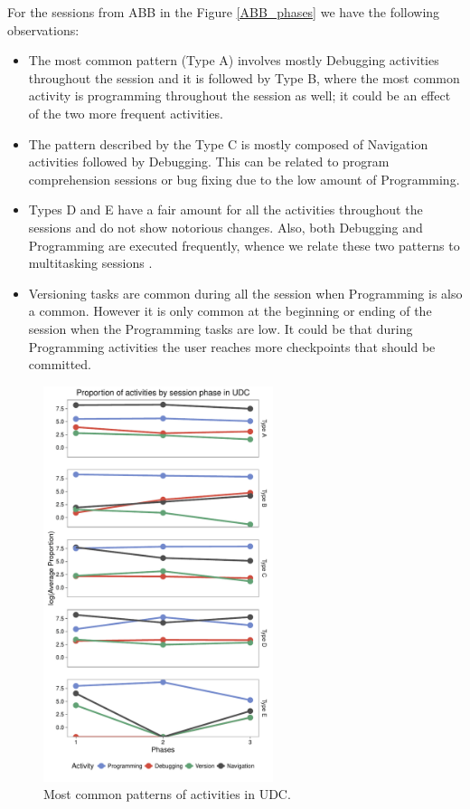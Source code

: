 For the sessions from ABB in the Figure \ref{ABB_phases} we have the following observations:
\begin{itemize}
	\item The most common pattern (Type A) involves mostly Debugging activities throughout the session and it is followed by Type B, where the most common activity is programming throughout the session as well; it could be an effect of the two more frequent activities.
	
	\item The pattern described by the Type C is mostly composed of Navigation activities followed by Debugging. This can be related to program comprehension sessions \cite{MMLK14} or bug fixing due to the low amount of Programming.
	
	\item Types D and E have a fair amount for all the activities throughout the sessions and do not show notorious changes. Also, both Debugging and Programming are executed frequently, whence we relate these two patterns to multitasking sessions \cite{SLV10}.
	
	\item Versioning tasks are common during all the session when Programming is also a common. However it is only common at the beginning or ending of the session when the Programming tasks are low. It could be that during Programming activities the user reaches more checkpoints that should be committed. 
\end{itemize}

\begin{figure}[!ht]
	
	\centering
	\includegraphics[width=0.6\textwidth]{Figures/UDC_phases_log}
	
	\caption{Most common patterns of activities in UDC.}
	\label{UDC_phases}
\end{figure}

